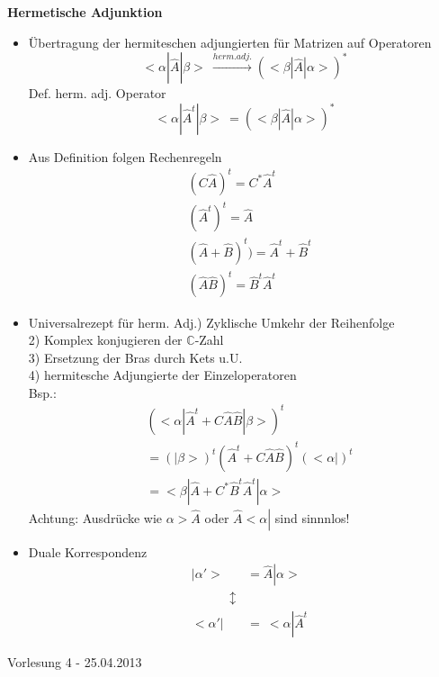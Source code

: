 \documentclass[10pt,article,colorback,accentcolor=tud9d]{scrartcl}
\begin{document}
\textbf{Hermetische Adjunktion}
\begin{fleqn}
\begin{itemize}
\item Übertragung der hermiteschen adjungierten für Matrizen auf Operatoren
  \begin{equation}
  <\alpha\left|\right.\hat{A}\left|\right.\beta> \ \xrightarrow{herm. adj.} (<
\beta \left|\right.\hat{A}\left|\right.\alpha>)^*
  \end{equation}
  Def. herm. adj. Operator
  \begin{equation}
  <\alpha\left|\right.{\hat{A}}^t \left|\right. \beta> \ =(<\beta\left|\right.
\hat{A}\left|\right.\alpha>)^*
  \end{equation}
\item Aus Definition folgen Rechenregeln
  \begin{equation}
  \begin{aligned}
  &(C\hat{A})^t=C^*{\hat{A}}^t\\
  &({\hat{A}}^t)^t=\hat{A}\\
  &(\hat{A} + \hat{B})^t )= \hat{A}^t + \hat{B}^t\\
  &(\hat{A}\hat{B})^t=\hat{B}^t\hat{A}^t
  \end{aligned}
  \end{equation}
\item \onehalfspacing Universalrezept für herm. Adj.) Zyklische Umkehr der Reihenfolge\\
  2) Komplex konjugieren der $\mathbb{C}$-Zahl\\
  3) Ersetzung der Bras durch Kets u.U.\\
  4) hermitesche Adjungierte der Einzeloperatoren\\
  Bsp.:
  \begin{equation}
  \begin{aligned}
  &(<\alpha\left|\right.\hat{A}^t+C\hat{A}\hat{B}\left|\right.\beta>)^t\\
  &= (\left|\right.\beta>)^t (\hat{A}^t+C\hat{A}\hat{B})^t(<\alpha\left|\right
.)^t\\
  &= <\beta\left|\right. \hat{A} +C^*\hat{B}^t \hat{A}^t \left|\right.\alpha>
  \end{aligned}
  \end{equation}
  Achtung: Ausdrücke wie $\alpha>\hat{A}$ oder $ \hat{A}<\alpha\left|\right.$ 
sind sinnnlos!
\item Duale Korrespondenz
  \begin{equation}
  \begin{aligned}
  &\left|\right.\alpha'>&=\hat{A}\left|\right.\alpha>\\
  & \quad \quad \quad \updownarrow&\\
  &<\alpha'\left|\right.&= \ <\alpha\left|\right.\hat{A}^t
  \end{aligned}
  \end{equation}
\end{itemize}
\begin{flushright}
Vorlesung 4 - 25.04.2013
\end{flushright}

\end{fleqn}
\end{document}
